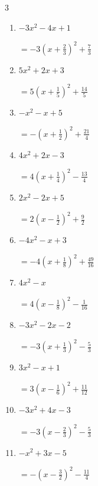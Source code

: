 \begin{multicols}{3}
\begin{enumerate}
        $\displaystyle =-2\left( x-1\right)^{2}+4$

\columnbreak %

  \item $-3x^{2}-4x+1$

        $\displaystyle =-3\left( x+\frac{2}{3}\right)^{2}+\frac{7}{3}$

  \item $5x^{2}+2x+3$

        $\displaystyle =5\left( x+\frac{1}{5}\right)^{2}+\frac{14}{5}$

  \item $-x^{2}-x+5$

        $\displaystyle =-\left( x+\frac{1}{2}\right)^{2}+\frac{21}{4}$

  \item $4x^{2}+2x-3$

        $\displaystyle =4\left( x+\frac{1}{4}\right)^{2}-\frac{13}{4}$

  \item $2x^{2}-2x+5$

        $\displaystyle =2\left( x-\frac{1}{2}\right)^{2}+\frac{9}{2}$

\columnbreak %

  \item $-4x^{2}-x+3$

        $\displaystyle =-4\left( x+\frac{1}{8}\right)^{2}+\frac{49}{16}$

  \item $4x^{2}-x$

        $\displaystyle =4\left( x-\frac{1}{8}\right)^{2}-\frac{1}{16}$

  \item $-3x^{2}-2x-2$

        $\displaystyle =-3\left( x+\frac{1}{3}\right)^{2}-\frac{5}{3}$

  \item $3x^{2}-x+1$

        $\displaystyle =3\left( x-\frac{1}{6}\right)^{2}+\frac{11}{12}$

  \item $-3x^{2}+4x-3$

        $\displaystyle =-3\left( x-\frac{2}{3}\right)^{2}-\frac{5}{3}$

\columnbreak %

\resetques

  \item $-x^{2}+3x-5$

        $\displaystyle =-\left( x-\frac{3}{2}\right)^{2}-\frac{11}{4}$


\end{enumerate}
\end{multicols}
